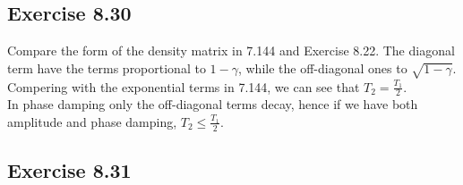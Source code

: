 \documentclass[a4paper,12pt]{article}
\begin{document}
\subsection*{Exercise 8.30}
Compare the form of the density matrix in 7.144 and Exercise 8.22. The diagonal term have the
terms proportional to $1-\gamma$, while the off-diagonal ones to $\sqrt{1-\gamma}$. Compering
with the exponential terms in 7.144, we can see that $T_2=\frac{T_1}{2}$.\\
In phase damping only the off-diagonal terms decay, hence if we have both amplitude and
phase damping, $T_2\leq\frac{T_1}{2}$.
\subsection*{Exercise 8.31}
\end{document}
